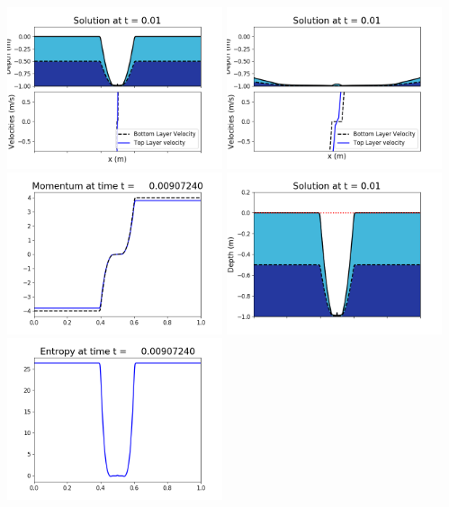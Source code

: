 \documentclass[11pt]{article}
\begin{document}
\vskip 10pt 
\includegraphics[width=0.475\textwidth]{frame0057fig1001.png}
\includegraphics[width=0.475\textwidth]{frame0057fig1002.png}
\vskip 10pt 
\includegraphics[width=0.475\textwidth]{frame0057fig1003.png}
\includegraphics[width=0.475\textwidth]{frame0057fig1006.png}
\vskip 10pt 
\includegraphics[width=0.475\textwidth]{frame0057fig1007.png}
\end{document}
